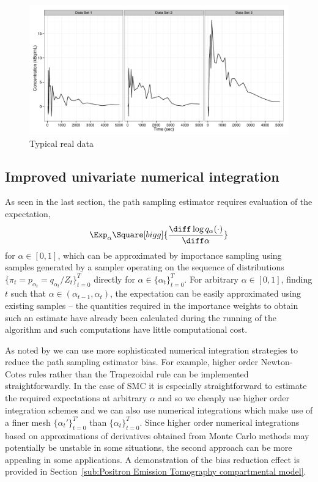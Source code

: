 \begin{figure}[t]
  \includegraphics[width=\linewidth]{fig/Typical_PET}
  \caption{Typical real \pet data}
  \label{fig:typical real pet}
\end{figure}

\subsection{Improved univariate numerical integration}
\label{sub:Improved univariate numerical integration}

As seen in the last section, the path sampling estimator requires evaluation
of the expectation,
\begin{equation*}
  \Exp_\alpha \Square[bigg]{\frac{\diff\log q_{\alpha}(\cdot)}{\diff\alpha}}
\end{equation*}
for $\alpha\in[0,1]$, which can be approximated by importance sampling using
samples generated by a \smc sampler operating on the sequence of distributions
$\{\pi_t = p_{\alpha_t} = q_{\alpha_t}/Z_t\}_{t=0}^T$ directly for
$\alpha\in\{\alpha_t\}_{t=0}^T$. For arbitrary $\alpha\in[0,1]$, finding $t$
such that $\alpha\in(\alpha_{t-1},\alpha_t)$, the expectation can be easily
approximated using existing \smc samples -- the quantities required in the
importance weights to obtain such an estimate have already been calculated
during the running of the \smc algorithm and such computations have little
computational cost.

As noted by \cite{Friel:2012}  we can use more sophisticated numerical
integration strategies to reduce the path sampling estimator bias. For
example, higher order Newton-Cotes rules rather than the Trapezoidal rule can
be implemented straightforwardly. In the case of SMC it is especially
straightforward to estimate the required expectations at arbitrary $\alpha$
and so we cheaply use higher order integration schemes and we can also use
numerical integrations which make use of a finer mesh
$\{\alpha_t'\}_{t=0}^{T'}$ than $\{\alpha_t\}_{t=0}^T$. Since higher order
numerical integrations based on approximations of derivatives obtained from
Monte Carlo methods may potentially be unstable in some situations, the second
approach can be more appealing in some applications. A demonstration of the
bias reduction effect is provided in Section~\ref{sub:Positron Emission
  Tomography compartmental model}.

